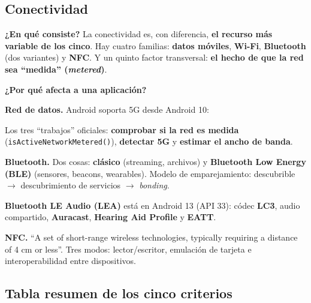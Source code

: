 \documentclass[11pt,a4paper]{article}
\newcommand{\code}[1]{\texttt{\color{navylight}#1}}
\newcommand{\campo}[1]{\textbf{\color{navy}#1}}
\begin{document}
	\subsection{Conectividad}
	
	\campo{¿En qué consiste?}
	La conectividad es, con diferencia, \textbf{el recurso más variable de los cinco}. Hay cuatro familias: \textbf{datos móviles}, \textbf{Wi-Fi}, \textbf{Bluetooth} (dos variantes) y \textbf{NFC}. Y un quinto factor transversal: \textbf{el hecho de que la red sea \enquote{medida} (\emph{metered})}.
	
	\textbf{\color{primary}¿Por qué afecta a una aplicación?}
	
	\textbf{Red de datos.} Android soporta 5G desde Android 10:
	
	Los tres \enquote{trabajos} oficiales: \textbf{comprobar si la red es medida} (\code{isActiveNetworkMetered()}), \textbf{detectar 5G} y \textbf{estimar el ancho de banda}.
	
	\textbf{Bluetooth.} Dos cosas: \textbf{clásico} (streaming, archivos) y \textbf{Bluetooth Low Energy (BLE)} (sensores, beacons, wearables). Modelo de emparejamiento: descubrible $\to$ descubrimiento de servicios $\to$ \emph{bonding}.
	
	\textbf{Bluetooth LE Audio (LEA)} está en Android 13 (API 33): códec \textbf{LC3}, audio compartido, \textbf{Auracast}, \textbf{Hearing Aid Profile} y \textbf{EATT}.
	
	\textbf{NFC.} \enquote{A set of short-range wireless technologies, typically requiring a distance of 4 cm or less}. Tres modos: lector/escritor, emulación de tarjeta e interoperabilidad entre dispositivos.
	
	\subsection{Tabla resumen de los cinco criterios}
	
\end{document}
